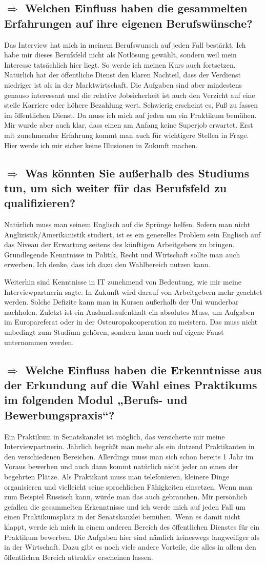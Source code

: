 \documentclass{../../sem_paper}
\newcommand\quest[1]{\subsection*{$\Rightarrow$ #1}}
\begin{document}
\quest{Welchen Einfluss haben die gesammelten Erfahrungen auf ihre eigenen Berufswünsche?}
Das Interview hat mich in meinem Berufswunsch auf jeden Fall bestärkt. Ich habe mir dieses Berufsfeld nicht als Notlösung gewählt, sondern weil mein Interesse tatsächlich hier liegt. So werde ich meinen Kurs auch fortsetzen. Natürlich hat der öffentliche Dienst den klaren Nachteil, dass der Verdienst niedriger ist als in der  Marktwirtschaft. Die Aufgaben sind aber mindestens genauso interessant und die relative Jobsicherheit ist auch den Verzicht auf eine steile Karriere oder höhere Bezahlung wert. Schwierig erscheint es, Fuß zu fassen im öffentlichen Dienst. Da muss ich mich auf jeden um ein Praktikum bemühen.
Mir wurde aber auch klar, dass einen am Anfang keine Superjob erwartet. Erst mit zunehmender Erfahrung kommt man auch für wichtigere Stellen in Frage. Hier werde ich mir sicher keine Illusionen in Zukunft machen.

\quest{Was könnten Sie außerhalb des Studiums tun, um sich weiter für das Berufsfeld zu qualifizieren?}
Natürlich muss man seinem Englisch  auf die Sprünge helfen. Sofern man nicht Anglizistik/Amerikanistik studiert, ist es ein generelles Problem sein Englisch auf das Niveau der Erwartung seitens des künftigen Arbeitgebers zu bringen. 
Grundlegende Kenntnisse in Politik, Recht und Wirtschaft sollte man auch erwerben. Ich denke, dass ich dazu den Wahlbereich nutzen kann.

Weiterhin sind Kenntnisse in IT zunehmend von Bedeutung, wie mir meine Interviewpartnerin sagte. In Zukunft wird darauf von Arbeitgebern mehr geachtet werden. Solche Defizite kann man in Kursen außerhalb der Uni wunderbar nachholen.
Zuletzt ist ein Auslandsaufenthalt ein absolutes Muss, um Aufgaben im Europareferat oder in der Osteuropakooperation zu meistern. Das muss nicht unbedingt zum Studium gehören, sondern kann auch auf eigene Faust unternommen werden.

\quest{Welche Einfluss haben die Erkenntnisse aus der Erkundung auf die Wahl eines Praktikums im folgenden Modul „Berufs- und Bewerbungspraxis“?}
Ein Praktikum in Senatskanzlei ist möglich, das versicherte mir meine Interviewpartnerin. Jährlich begrüßt man mehr als ein dutzend Praktikanten in den verschiedenen Bereichen.
Allerdings muss man sich schon bereits 1 Jahr im Voraus bewerben und auch dann kommt natürlich nicht jeder an einen der begehrten Plätze. Als Praktikant muss man telefonieren, kleinere Dinge organisieren und vielleicht seine sprachlichen Fähigkeiten einsetzen. Wenn man zum Beispiel Russisch kann, würde man das auch gebrauchen.
Mir persönlich gefallen die gesammelten Erkenntnisse und ich werde mich auf jeden Fall um einen Praktikumsplatz in der Senatskanzlei bemühen. Wenn es damit nicht klappt, werde ich mich in einem anderen Bereich des  öffentlichen Dienstes für ein Praktikum bewerben. Die Aufgaben hier sind nämlich keineswegs langweiliger als in der Wirtschaft. Dazu gibt es noch viele andere Vorteile, die alles in allem den öffentlichen  Bereich attraktiv erscheinen lassen.
\end{document}
